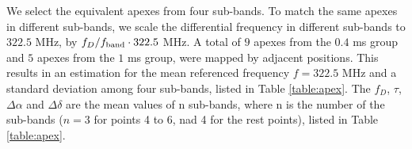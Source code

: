 \documentclass[useAMS,usenatbib]{mn2e}
\begin{document}
We select the equivalent apexes from four sub-bands. To match the same apexes in different sub-bands, we scale the differential frequency in different sub-bands to $322.5$ MHz, by $f_D/f_{\rm band}\cdot322.5$ MHz. A total of $9$ apexes from the $0.4$ ms group and $5$ apexes from the $1$ ms
group, were mapped by adjacent positions. This results in an estimation
for the mean referenced frequency $f=322.5$ MHz and a standard deviation among four sub-bands, listed in Table
\ref{table:apex}. The $f_D$, $\tau$, $\Delta\alpha$ and $\Delta\delta$ are the mean values of n sub-bands, where n is the number of the sub-bands ($n=3$ for points 4 to 6, nad 4 for the rest points), listed in Table \ref{table:apex}.
\end{document}
